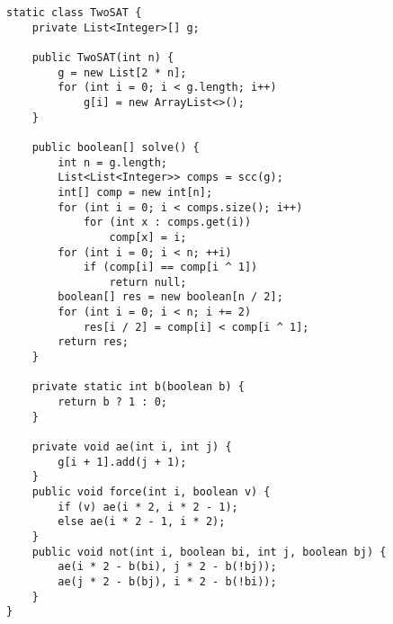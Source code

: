 \begin{verbatim}
static class TwoSAT {
	private List<Integer>[] g;
	
	public TwoSAT(int n) {
		g = new List[2 * n];
		for (int i = 0; i < g.length; i++)
			g[i] = new ArrayList<>();
	}
	
	public boolean[] solve() {
		int n = g.length;
		List<List<Integer>> comps = scc(g);
		int[] comp = new int[n];
		for (int i = 0; i < comps.size(); i++)
			for (int x : comps.get(i))
				comp[x] = i;
		for (int i = 0; i < n; ++i)
			if (comp[i] == comp[i ^ 1])
				return null;
		boolean[] res = new boolean[n / 2];
		for (int i = 0; i < n; i += 2)
			res[i / 2] = comp[i] < comp[i ^ 1];
		return res;
	}
	
	private static int b(boolean b) {
		return b ? 1 : 0;
	}
	
	private void ae(int i, int j) {
		g[i + 1].add(j + 1);
	}
	public void force(int i, boolean v) {
		if (v) ae(i * 2, i * 2 - 1);
		else ae(i * 2 - 1, i * 2);
	}
	public void not(int i, boolean bi, int j, boolean bj) {
		ae(i * 2 - b(bi), j * 2 - b(!bj));
		ae(j * 2 - b(bj), i * 2 - b(!bi));
	}
}
\end{verbatim}